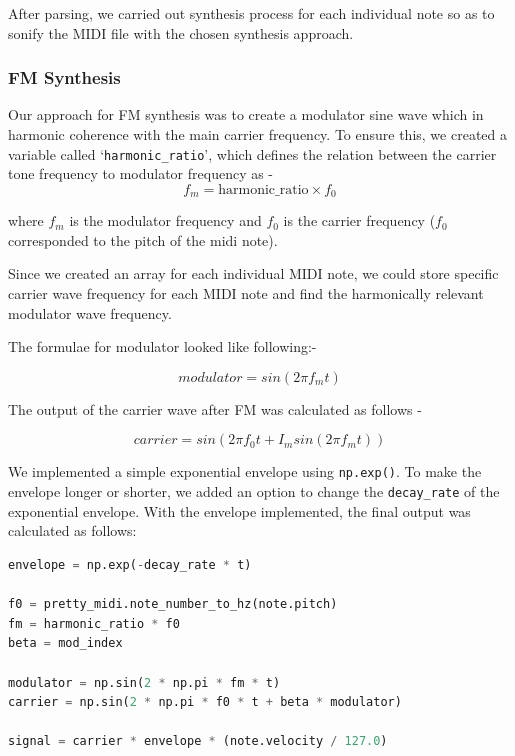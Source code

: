 \documentclass[11pt]{article}
\begin{document}
After parsing, we carried out synthesis process for each individual note so as to sonify the MIDI file with the chosen synthesis approach. 

\subsubsection{FM Synthesis}

Our approach for FM synthesis was to create a modulator sine wave which in harmonic coherence with the main carrier frequency. To ensure this, we created a variable called `\texttt{harmonic\_ratio}', which defines the relation between the carrier tone frequency to modulator frequency as - 
\begin{equation}
f_m = \text{harmonic\_ratio} \times f_0
\end{equation}

where $f_m$ is the modulator frequency and $f_0$ is the carrier frequency ($f_0$ corresponded to the pitch of the midi note).

Since we created an array for each individual MIDI note, we could store specific carrier wave frequency for each MIDI note and find the harmonically relevant modulator wave frequency. 

The formulae for modulator looked like following:- 

\begin{equation}
    modulator = sin (2\pi f_mt)
\end{equation}

The output of the carrier wave after FM was calculated as follows - 

\begin{equation}
    carrier = sin (2\pi f_0t + I_msin(2 \pi f_mt) )
\end{equation}

We implemented a simple exponential envelope using \texttt{np.exp()}. To make the envelope longer or shorter, we added an option to change the \texttt{decay\_rate} of the exponential envelope. With the envelope implemented, the final output was calculated as follows: 

\begin{lstlisting}[language= Python]
envelope = np.exp(-decay_rate * t)

f0 = pretty_midi.note_number_to_hz(note.pitch)
fm = harmonic_ratio * f0
beta = mod_index

modulator = np.sin(2 * np.pi * fm * t)
carrier = np.sin(2 * np.pi * f0 * t + beta * modulator)

signal = carrier * envelope * (note.velocity / 127.0)
\end{lstlisting}
\end{document}
